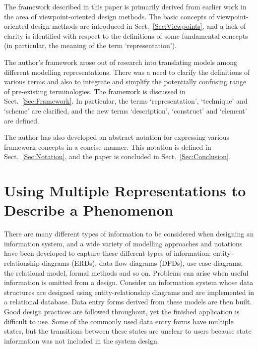\documentclass[10pt]{llncs}
\begin{document}
The framework described in this paper is primarily derived from earlier work in the area of viewpoint-oriented design methods. The basic concepts of viewpoint-oriented design methods are introduced in Sect.~\ref{Sec:Viewpoints}, and a lack of clarity is identified with respect to the definitions of some fundamental concepts (in particular, the meaning of the term `representation').

The author's framework arose out of research into translating models among different modelling representations. There was a need to clarify the definitions of various terms and also to integrate and simplify the potentially confusing range of pre-existing terminologies. The framework is discussed in Sect.~\ref{Sec:Framework}. In particular, the terms `representation', `technique' and `scheme' are clarified, and the new terms `description', `construct' and `element' are defined.

The author has also developed an abstract notation for expressing various framework concepts in a concise manner. This notation is defined in Sect.~\ref{Sec:Notation}, and the paper is concluded in Sect.~\ref{Sec:Conclusion}.


\section{Using Multiple Representations to Describe a Phenomenon}
\label{Sec:MultipleRepresentations}

There are many different types of information to be considered when designing an information system, and a wide variety of modelling approaches and notations have been developed to capture these different types of information: entity-relationship diagrams (ERDs), data flow diagrams (DFDs), use case diagrams, the relational model, formal methods and so on. Problems can arise when useful information is omitted from a design. Consider an information system whose data structures are designed using entity-relationship diagrams and are implemented in a relational database. Data entry forms derived from these models are then built. Good design practices are followed throughout, yet the finished application is difficult to use. Some of the commonly used data entry forms have multiple states, but the transitions between these states are unclear to users because state information was not included in the system design.
\end{document}
